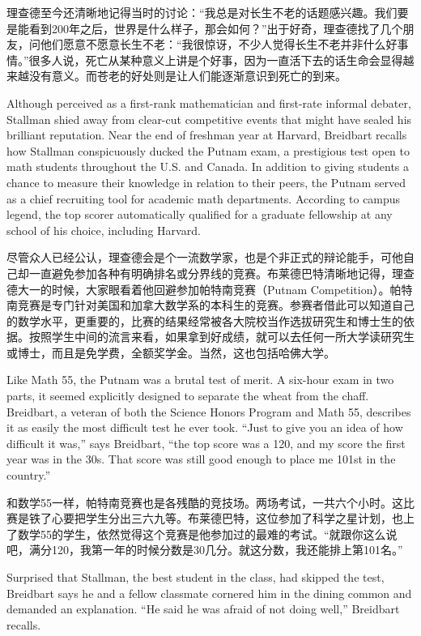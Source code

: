 \ifdefined\chs
理查德至今还清晰地记得当时的讨论：“我总是对长生不老的话题感兴趣。我们要是能看到200年之后，世界是什么样子，那会如何？”出于好奇，理查德找了几个朋友，问他们愿意不愿意长生不老：“我很惊讶，不少人觉得长生不老并非什么好事情。”很多人说，死亡从某种意义上讲是个好事，因为一直活下去的话生命会显得越来越没有意义。而苍老的好处则是让人们能逐渐意识到死亡的到来。
\fi

\ifdefined\eng
Although perceived as a first-rank mathematician and first-rate informal debater, Stallman shied away from clear-cut competitive events that might have sealed his brilliant reputation. Near the end of freshman year at Harvard, Breidbart recalls how Stallman conspicuously ducked the Putnam exam, a prestigious test open to math students throughout the U.S. and Canada. In addition to giving students a chance to measure their knowledge in relation to their peers, the Putnam served as a chief recruiting tool for academic math departments. According to campus legend, the top scorer automatically qualified for a graduate fellowship at any school of his choice, including Harvard.
\fi

\ifdefined\chs
尽管众人已经公认，理查德会是个一流数学家，也是个非正式的辩论能手，可他自己却一直避免参加各种有明确排名或分界线的竞赛。布莱德巴特清晰地记得，理查德大一的时候，大家眼看着他回避参加帕特南竞赛（Putnam Competition）。帕特南竞赛是专门针对美国和加拿大数学系的本科生的竞赛。参赛者借此可以知道自己的数学水平，更重要的，比赛的结果经常被各大院校当作选拔研究生和博士生的依据。按照学生中间的流言来看，如果拿到好成绩，就可以去任何一所大学读研究生或博士，而且是免学费，全额奖学金。当然，这也包括哈佛大学。
\fi

\ifdefined\eng
Like Math 55, the Putnam was a brutal test of merit. A six-hour exam in two parts, it seemed explicitly designed to separate the wheat from the chaff. Breidbart, a veteran of both the Science Honors Program and Math 55, describes it as easily the most difficult test he ever took. ``Just to give you an idea of how difficult it was,'' says Breidbart, ``the top score was a 120, and my score the first year was in the 30s. That score was still good enough to place me 101st in the country.''
\fi

\ifdefined\chs
和数学55一样，帕特南竞赛也是各残酷的竞技场。两场考试，一共六个小时。这比赛是铁了心要把学生分出三六九等。布莱德巴特，这位参加了科学之星计划，也上了数学55的学生，依然觉得这个竞赛是他参加过的最难的考试。“就跟你这么说吧，满分120，我第一年的时候分数是30几分。就这分数，我还能排上第101名。”
\fi

\ifdefined\eng
Surprised that Stallman, the best student in the class, had skipped the test, Breidbart says he and a fellow classmate cornered him in the dining common and demanded an explanation. ``He said he was afraid of not doing well,'' Breidbart recalls.
\fi

